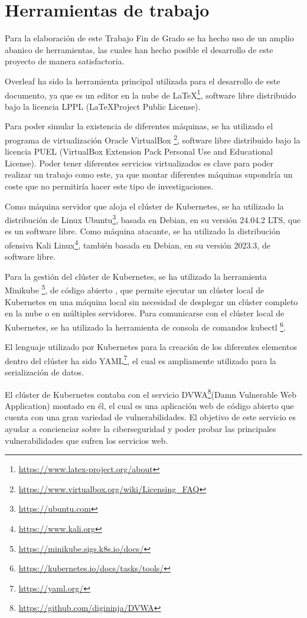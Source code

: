 \documentclass[12pt,twoside,titlepage]{report}
\begin{document}
\section{Herramientas de trabajo}

Para la elaboración de este Trabajo Fin de Grado se ha hecho uso de un amplio
abanico de herramientas, las cuales han hecho posible el desarrollo de este proyecto de manera satisfactoria.

Overleaf ha sido la herramienta principal utilizada para el desarrollo de este documento, ya que es un editor en la nube de \LaTeX \footnote{\url{https://www.latex-project.org/about}}, software libre distribuido bajo la licencia LPPL (\LaTeX Project Public License).

Para poder simular la existencia de diferentes máquinas, se ha utilizado el programa de virtualización Oracle VirtualBox \footnote{\url{https://www.virtualbox.org/wiki/Licensing_FAQ}}, software libre distribuido bajo la licencia PUEL (VirtualBox Extension Pack Personal Use and Educational License). Poder tener diferentes servicios virtualizados es clave para poder realizar un trabajo como este, ya que montar diferentes máquinas supondría un coste que no permitiría hacer este tipo de investigaciones.

Como máquina servidor que aloja el clúster de Kubernetes, se ha utilizado la distribución de Linux Ubuntu\footnote{\url{https://ubuntu.com}}, basada en Debian, en su versión 24.04.2 LTS, que es un software libre. Como máquina atacante, se ha utilizado la distribución ofensiva Kali Linux\footnote{\url{https://www.kali.org}}, también basada en Debian, en su versión 2023.3, de software libre.

Para la gestión del clúster de Kubernetes, se ha utilizado la herramienta Minikube \footnote{\url{https://minikube.sigs.k8s.io/docs/}}, de código abierto , que permite ejecutar un clúster local de Kubernetes en una máquina local sin necesidad de desplegar un clúster completo en la nube o en múltiples servidores. Para comunicarse con el clúster local de Kubernetes, se ha utilizado la herramienta de consola de comandos kubectl \footnote{\url{https://kubernetes.io/docs/tasks/tools/}}.

El lenguaje utilizado por Kubernetes para la creación de los diferentes elementos dentro del clúster ha sido YAML\footnote{\url{https://yaml.org/}}, el cual es ampliamente utilizado para la serialización de datos.

El clúster de Kubernetes contaba con el servicio DVWA\footnote{\url{https://github.com/digininja/DVWA}}(Damn Vulnerable Web Application) montado en él, el cual es una aplicación web de código abierto que cuenta con una gran variedad de vulnerabilidades. El objetivo de este servicio es ayudar a concienciar sobre la ciberseguridad y poder probar las principales vulnerabilidades que sufren los servicios web.
\end{document}
